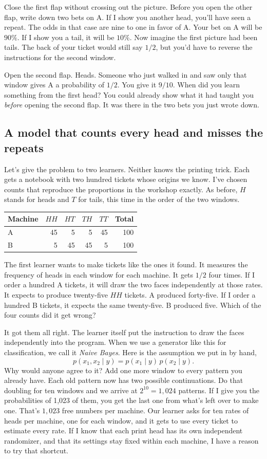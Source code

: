 \documentclass[12pt,oneside]{article}
\newcommand{\secao}[1]{\Needspace{5.2\baselineskip}\subsection*{#1}}
\newcommand{\bookanchor}[1]{\phantomsection\label{#1}}
\begin{document}
Close the first flap without crossing out the picture. Before you open the other flap, write down two bets on A. If I show you another head, you'll have seen a repeat. The odds in that case are nine to one in favor of A. Your bet on A will be $90\%$. If I show you a tail, it will be $10\%$. Now imagine the first picture had been tails. The back of your ticket would still say $1/2$, but you'd have to reverse the instructions for the second window.

Open the second flap. Heads. Someone who just walked in and saw only that window gives A a probability of $1/2$. You give it $9/10$. When did you learn something from the first head? You could already show what it had taught you \emph{before} opening the second flap. It was there in the two bets you just wrote down.

\secao{A model that counts every head and misses the repeats}
Let's give the problem to two learners. Neither knows the printing trick. Each gets a notebook with two hundred tickets whose origins we know. I've chosen counts that reproduce the proportions in the workshop exactly. As before, $H$ stands for heads and $T$ for tails, this time in the order of the two windows.
\begin{center}
\begin{tabular}{lrrrrr}
\toprule
Machine & $HH$ & $HT$ & $TH$ & $TT$ & Total \\
\midrule
A & 45 & 5 & 5 & 45 & 100 \\
B & 5 & 45 & 45 & 5 & 100 \\
\bottomrule
\end{tabular}
\end{center}

The first learner wants to make tickets like the ones it found. It measures the frequency of heads in each window for each machine. It gets $1/2$ four times. If I order a hundred A tickets, it will draw the two faces independently at those rates. It expects to produce twenty-five $HH$ tickets. A produced forty-five. If I order a hundred B tickets, it expects the same twenty-five. B produced five. Which of the four counts did it get wrong?

It\bookanchor{topic-05-1} got them all right. The learner itself put the instruction to draw the faces independently into the program. When we use a generator like this for classification, we call it \emph{Naive Bayes}. Here is the assumption we put in by hand,
\[
     p(x_1,x_2\mid y)=p(x_1\mid y)\,p(x_2\mid y).
\]
Why would anyone agree to it? Add one more window to every pattern you already have. Each old pattern now has two possible continuations. Do that doubling for ten windows and we arrive at $2^{10}=1{,}024$ patterns. If I give you the probabilities of 1,023 of them, you get the last one from what's left over to make one. That's $1{,}023$ free numbers per machine. Our learner asks for ten rates of heads per machine, one for each window, and it gets to use every ticket to estimate every rate. If I know that each print head has its own independent randomizer, and that its settings stay fixed within each machine, I have a reason to try that shortcut.
\end{document}
